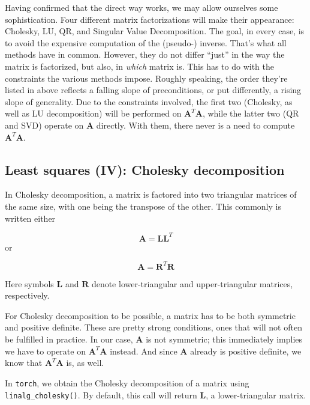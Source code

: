 \documentclass[
  letterpaper,
]{krantz}
\begin{document}
Having confirmed that the direct way works, we may allow ourselves some
sophistication. Four different matrix factorizations will make their
appearance: Cholesky, LU, QR, and Singular Value Decomposition. The
goal, in every case, is to avoid the expensive computation of the
(pseudo-) inverse. That's what all methods have in common. However, they
do not differ ``just'' in the way the matrix is factorized, but also, in
\emph{which} matrix is. This has to do with the constraints the various
methods impose. Roughly speaking, the order they're listed in above
reflects a falling slope of preconditions, or put differently, a rising
slope of generality. Due to the constraints involved, the first two
(Cholesky, as well as LU decomposition) will be performed on
\(\mathbf{A}^T\mathbf{A}\), while the latter two (QR and SVD) operate on
\(\mathbf{A}\) directly. With them, there never is a need to compute
\(\mathbf{A}^T\mathbf{A}\).

\hypertarget{least-squares-iv-cholesky-decomposition}{%
\subsection{\texorpdfstring{Least squares (IV): Cholesky
decomposition}{Least squares (IV): Cholesky decomposition}}\label{least-squares-iv-cholesky-decomposition}}

In Cholesky decomposition, a matrix is factored into two triangular
matrices of the same size, with one being the transpose of the other.
This commonly is written either

\[
\mathbf{A} = \mathbf{L} \mathbf{L}^T
\] or

\[
\mathbf{A} = \mathbf{R}^T\mathbf{R}
\]

Here symbols \(\mathbf{L}\) and \(\mathbf{R}\) denote lower-triangular
and upper-triangular matrices, respectively.

For Cholesky decomposition to be possible, a matrix has to be both
symmetric and positive definite. These are pretty strong conditions,
ones that will not often be fulfilled in practice. In our case,
\(\mathbf{A}\) is not symmetric; this immediately implies we have to
operate on \(\mathbf{A}^T\mathbf{A}\) instead. And since \(\mathbf{A}\)
already is positive definite, we know that \(\mathbf{A}^T\mathbf{A}\)
is, as well.

In \texttt{torch}, we obtain the Cholesky decomposition of a matrix
using \texttt{linalg\_cholesky()}. By default, this call will return
\(\mathbf{L}\), a lower-triangular matrix.
\end{document}
